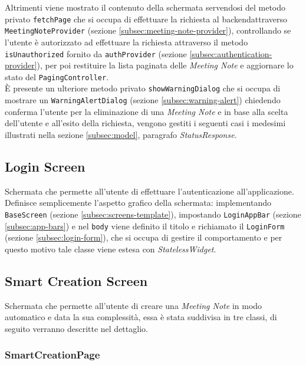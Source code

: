 Altrimenti viene mostrato il contenuto della schermata servendosi del metodo privato \lstinline{fetchPage} che si occupa di effettuare la richiesta al \gls{backend}\glsoccur attraverso \lstinline{MeetingNoteProvider} (sezione \ref{subsec:meeting-note-provider}), controllando se l'utente è autorizzato ad effettuare la richiesta attraverso il metodo \lstinline{isUnauthorized} fornito da \lstinline{authProvider} (sezione \ref{subsec:authentication-provider}), per poi restituire la lista paginata delle \emph{Meeting Note} e aggiornare lo stato del \lstinline{PagingController}. \\
È presente un ulteriore metodo privato \lstinline{showWarningDialog} che si occupa di mostrare un \lstinline{WarningAlertDialog} (sezione \ref{subsec:warning-alert}) chiedendo conferma l'utente per la eliminazione di una \emph{Meeting Note} e in base alla scelta dell'utente e all'esito della richiesta, vengono gestiti i seguenti casi {i medesimi illustrati nella sezione \ref{subsec:model}, paragrafo \emph{StatusResponse}}.

\subsection{Login Screen}
\label{subsec:login-screen}

Schermata che permette all'utente di effettuare l'autenticazione all'applicazione. \\
Definisce semplicemente l'aspetto grafico della schermata: implementando \lstinline{BaseScreen} (sezione \ref{subsec:screens-template}), impostando \lstinline{LoginAppBar} (sezione \ref{subsec:app-bars}) e nel \lstinline{body} viene definito il titolo e richiamato il \lstinline{LoginForm} (sezione \ref{subsec:login-form}), che si occupa di gestire il comportamento e per questo motivo tale classe viene estesa con \emph{StatelessWidget}.

\subsection{Smart Creation Screen}
\label{subsec:smart-creation-screen}

Schermata che permette all'utente di creare una \emph{Meeting Note} in modo automatico e data la sua complessità, essa è stata suddivisa in tre classi, di seguito verranno descritte nel dettaglio. \\

\subsubsection*{SmartCreationPage}
\label{subsubsec:smart-creation-page}


